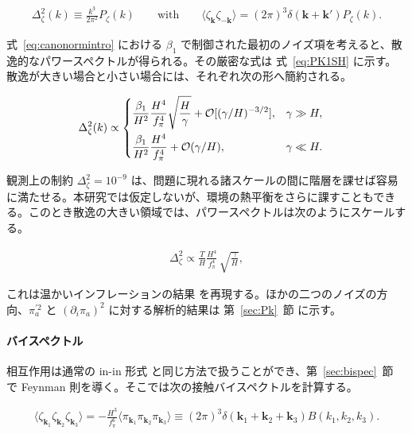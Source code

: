 \documentclass[a4paper,11pt]{ltjsarticle}
\numberwithin{equation}{section}
\def\pia{\pi_{a}}
\newcommand{\boldmathsymbol}[1]{{\ensuremath{\boldsymbol{#1}}}}
\newcommand{\bmk}{\boldmathsymbol{k}}
\newcommand{\Eq}[1]{Eq.~(\ref{#1})}
\newcommand{\Sec}[1]{Sec.~\ref{#1}}
\def\bmk{{\boldsymbol{k}}}
\renewcommand{\Eq}[1]{式~\eqref{#1}}
\renewcommand{\Sec}[1]{第~\ref{#1}~節}
\begin{document}
\begin{align}
\Delta^2_\zeta(k) \equiv \frac{k^3}{2\pi^2}P_\zeta(k) \qquad \mathrm{with} \qquad \langle \zeta_\bmk \zeta_{-\bmk}\rangle = (2\pi)^3 \delta(\bmk + \bmk') P_\zeta(k).
\end{align}

\Eq{eq:canonormintro} における $\beta_1$ で制御された最初のノイズ項を考えると、散逸的なパワースペクトルが得られる。その厳密な式は \Eq{eq:PK1SH} に示す。散逸が大きい場合と小さい場合には、それぞれ次の形へ簡約される。

\begin{align}
\Delta^2_\zeta(k)  &\propto  \begin{dcases}
\frac{\beta_1}{H^2} \frac{H^4}{f_\pi^4}   \sqrt{\frac{H}{\gamma}} + \mathcal{O}[(\gamma/H)^{-3/2}] , & \gamma \gg H,\\
\frac{\beta_1}{H^2} \frac{H^4}{f_\pi^4}  + \mathcal{O}(\gamma/H), & \gamma \ll H.
\end{dcases}
\end{align}

観測上の制約 $\Delta^2_\zeta=10^{-9}$ は、問題に現れる諸スケールの間に階層を課せば容易に満たせる。本研究では仮定しないが、環境の熱平衡をさらに課すこともできる。このとき散逸の大きい領域では、パワースペクトルは次のようにスケールする。

\begin{align}
\Delta^2_\zeta \propto \frac{T}{H}\frac{H^4}{f_\pi^4}\, \sqrt{\frac{\gamma}{H}},
\end{align}

これは温かいインフレーションの結果 \cite{Berera:1995ie,Berera:1995wh,Berera:2008ar,Ballesteros:2023dno,Montefalcone:2023pvh} を再現する。ほかの二つのノイズの方向、$\pia^{\prime2}$ と $(\partial_i\pia)^2$ に対する解析的結果は \Sec{sec:Pk} に示す。

\paragraph{バイスペクトル} 相互作用は通常の in-in 形式 \cite{Chen:2017ryl} と同じ方法で扱うことができ、\Sec{sec:bispec} で Feynman 則を導く。そこでは次の接触バイスペクトルを計算する。

\begin{align}
\langle \zeta_{\bmk_1}  \zeta_{\bmk_2}  \zeta_{\bmk_3} \rangle  = - \frac{H^3}{f_\pi^6}	\langle \pi_{\bmk_1}  \pi_{\bmk_2}  \pi_{\bmk_3} \rangle \equiv (2\pi)^3 \delta(\bmk_1 + \bmk_2 + \bmk_3) B(k_1,k_2,k_3).
\end{align}
\end{document}
